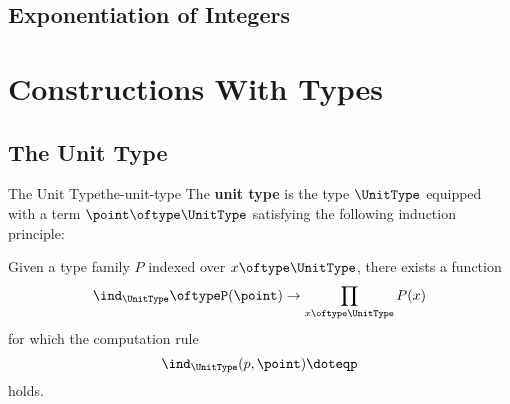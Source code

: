 \subsection{Exponentiation of Integers}\label{subsection-martin-löf-type-theory-exponentiation-of-integers}
\section{Constructions With Types}\label{section-constructions-with-types}
\subsection{The Unit Type}\label{subsection-the-unit-type}
\begin{definition}{The Unit Type}{the-unit-type}%
    The \textbf{unit type} is the type $\UnitType$ equipped with a term $\point\oftype\UnitType$ satisfying the following induction principle:
    \begin{itemize}
        \itemstar Given a type family $P$ indexed over $x\oftype\UnitType$, there exists a function
            \[
                \ind_{\UnitType}%
                \oftype%
                P(\point)%
                \to%
                \prod_{x\oftype\UnitType}P(x)%
            \]%
            for which the computation rule
            \[
                \ind_{\UnitType}(p,\point)%
                \doteq%
                p%
            \]%
            holds.
    \end{itemize}
\end{definition}
